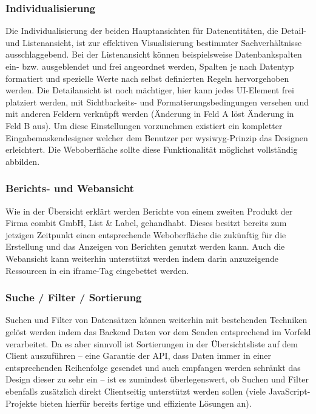 \subsubsection{Individualisierung}
Die Individualisierung der beiden Hauptansichten für Datenentitäten, die Detail- und Listenansicht, ist zur effektiven Visualisierung bestimmter Sachverhältnisse ausschlaggebend. Bei der Listenansicht können beispielsweise Datenbankspalten ein- bzw. ausgeblendet und frei angeordnet werden, Spalten je nach Datentyp formatiert und spezielle Werte nach selbst definierten Regeln hervorgehoben werden. Die Detailansicht ist noch mächtiger, hier kann jedes UI-Element frei platziert werden, mit Sichtbarkeits- und Formatierungsbedingungen versehen und mit anderen Feldern verknüpft werden (Änderung in Feld A löst Änderung in Feld B aus). Um diese Einstellungen vorzunehmen existiert ein kompletter Eingabemaskendesigner welcher dem Benutzer per \gls{wysiwyg}-Prinzip  das Designen erleichtert.
Die Weboberfläche sollte diese Funktionalität möglichst vollständig abbilden.

\subsubsection{Berichts- und Webansicht}
Wie in der Übersicht erklärt werden Berichte von einem zweiten Produkt der Firma combit GmbH, List \& Label, gehandhabt. Dieses besitzt bereits zum jetzigen Zeitpunkt einen entsprechende Weboberfläche die zukünftig für die Erstellung und das Anzeigen von Berichten genutzt werden kann. 
Auch die Webansicht kann weiterhin unterstützt werden indem darin anzuzeigende Ressourcen in ein iframe-Tag  eingebettet werden.

\subsubsection{Suche / Filter / Sortierung}
Suchen und Filter von Datensätzen können weiterhin mit bestehenden Techniken gelöst werden indem das Backend Daten vor dem Senden entsprechend im Vorfeld verarbeitet. Da es aber sinnvoll ist Sortierungen in der Übersichtsliste auf dem Client auszuführen -- eine Garantie der API, dass Daten immer in einer entsprechenden Reihenfolge gesendet und auch empfangen werden schränkt das Design dieser zu sehr ein -- ist es zumindest überlegenswert, ob Suchen und Filter ebenfalls zusätzlich direkt Clientseitig unterstützt werden sollen (viele JavaScript-Projekte bieten hierfür bereits fertige und effiziente Lösungen an).

